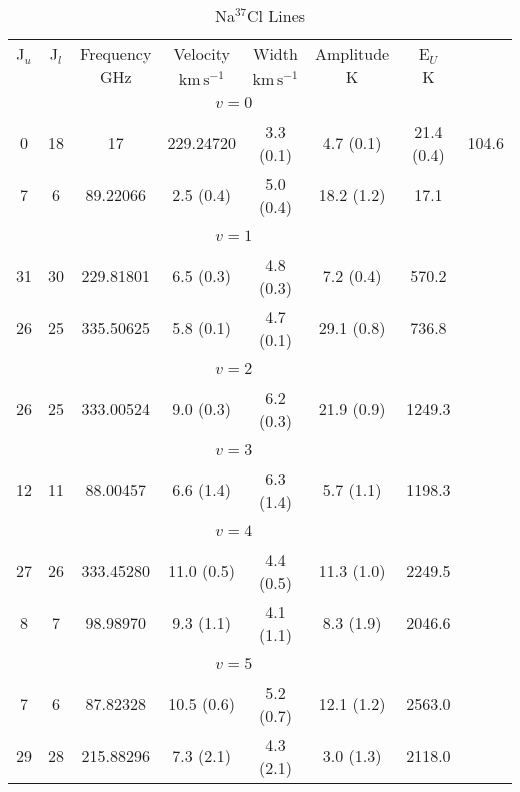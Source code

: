 \begin{table*}[htp]
\centering
\caption{Na$^{37}$Cl Lines}
\begin{tabular}{ccccccc}
\label{tab:Na37Cl_salt_lines}
 J$_u$ & J$_l$ & Frequency & Velocity & Width & Amplitude & E$_U$ \\
  &  & $\mathrm{GHz}$ & $\mathrm{km\,s^{-1}}$ & $\mathrm{km\,s^{-1}}$ & $\mathrm{K}$ & $\mathrm{K}$ \\
\hline
&\vspace{-0.75em}\\
 \\
\vspace{-0.75em}\\
0 & 18 & 17 & 229.24720 & 3.3 (0.1) & 4.7 (0.1) & 21.4 (0.4) & 104.6 \\
 7 & 6 & 89.22066 & 2.5 (0.4) & 5.0 (0.4) & 18.2 (1.2) & 17.1 \\
&\vspace{-0.75em}\\
 \\
\vspace{-0.75em}\\
 31 & 30 & 229.81801 & 6.5 (0.3) & 4.8 (0.3) & 7.2 (0.4) & 570.2 \\
 26 & 25 & 335.50625 & 5.8 (0.1) & 4.7 (0.1) & 29.1 (0.8) & 736.8 \\
&\vspace{-0.75em}\\
 \\
\vspace{-0.75em}\\
 26 & 25 & 333.00524 & 9.0 (0.3) & 6.2 (0.3) & 21.9 (0.9) & 1249.3 \\
&\vspace{-0.75em}\\
 \\
\vspace{-0.75em}\\
 12 & 11 & 88.00457 & 6.6 (1.4) & 6.3 (1.4) & 5.7 (1.1) & 1198.3 \\
&\vspace{-0.75em}\\
 \\
\vspace{-0.75em}\\
 27 & 26 & 333.45280 & 11.0 (0.5) & 4.4 (0.5) & 11.3 (1.0) & 2249.5 \\
 8 & 7 & 98.98970 & 9.3 (1.1) & 4.1 (1.1) & 8.3 (1.9) & 2046.6 \\
&\vspace{-0.75em}\\
 \\
\vspace{-0.75em}\\
 7 & 6 & 87.82328 & 10.5 (0.6) & 5.2 (0.7) & 12.1 (1.2) & 2563.0 \\
 29 & 28 & 215.88296 & 7.3 (2.1) & 4.3 (2.1) & 3.0 (1.3) & 2118.0 \\
\hline
\end{tabular}

\par 
\end{table*}
